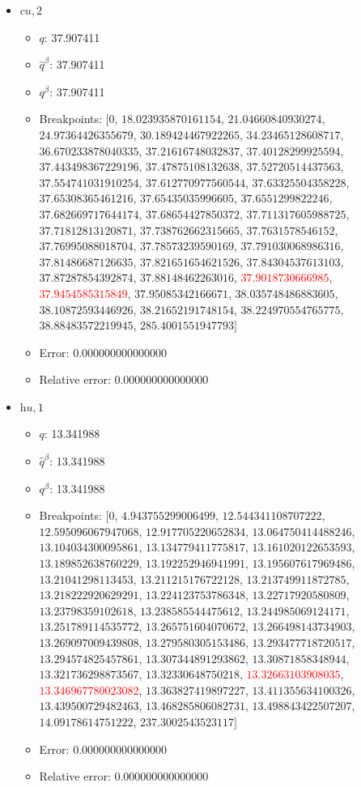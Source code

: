 \documentclass{article}%
\begin{document}
\begin{itemize}
\begin{itemize}
		\item Error: 0.000000000000000%
		\item Relative error: 0.000000000000000%
	\end{itemize}%
	\item $\textit{cu},2$%
	\begin{itemize}%
		\item $q$: 37.907411%
		\item $\hat{q}^\beta$: 37.907411%
		\item $q^\beta$: 37.907411%
		\item Breakpoints: $[$$0$, $18.023935870161154$, $21.04660840930274$, $24.97364426355679$, $30.189424467922265$, $34.23465128608717$, $36.670233878040335$, $37.21616748032837$, $37.40128299925594$, $37.443498367229196$, $37.47875108132638$, $37.52720514437563$, $37.554741031910254$, $37.612770977560544$, $37.63325504358228$, $37.65308365461216$, $37.65435035996605$, $37.6551299822246$, $37.682669717644174$, $37.68654427850372$, $37.711317605988725$, $37.71812813120871$, $37.738762662315665$, $37.7631578546152$, $37.76995088018704$, $37.78573239590169$, $37.791030068986316$, $37.81486687126635$, $37.821651654621526$, $37.84304537613103$, $37.87287854392874$, $37.88148462263016$, \textcolor{red}{$37.9018730666985$}, \textcolor{red}{$37.9454585315849$}, $37.95085342166671$, $38.035748486883605$, $38.10872593446926$, $38.21652191748154$, $38.224970554765775$, $38.88483572219945$, $285.4001551947793$$]$%
		\item Error: 0.000000000000000%
		\item Relative error: 0.000000000000000%
	\end{itemize}%
	\item $\textit{hu},1$%
	\begin{itemize}%
		\item $q$: 13.341988%
		\item $\hat{q}^\beta$: 13.341988%
		\item $q^\beta$: 13.341988%
		\item Breakpoints: $[$$0$, $4.943755299006499$, $12.544341108707222$, $12.595096067947068$, $12.917705220652834$, $13.064750414488246$, $13.104034300095861$, $13.134779411775817$, $13.161020122653593$, $13.189852638760229$, $13.192252946941991$, $13.195607617969486$, $13.21041298113453$, $13.211215176722128$, $13.213749911872785$, $13.218222920629291$, $13.224123753786348$, $13.22717920580809$, $13.23798359102618$, $13.238585544475612$, $13.244985069124171$, $13.251789114535772$, $13.265751604070672$, $13.266498143734903$, $13.269097009439808$, $13.279580305153486$, $13.293477718720517$, $13.294574825457861$, $13.307344891293862$, $13.30871858348944$, $13.321736298873567$, $13.32330648750218$, \textcolor{red}{$13.32663103908035$}, \textcolor{red}{$13.346967780023082$}, $13.363827419897227$, $13.411355634100326$, $13.439500729482463$, $13.468285806082731$, $13.498843422507207$, $14.09178614751222$, $237.3002543523117$$]$%
		\item Error: 0.000000000000000%
		\item Relative error: 0.000000000000000%
	\end{itemize}%
\end{itemize}%
\end{document}
